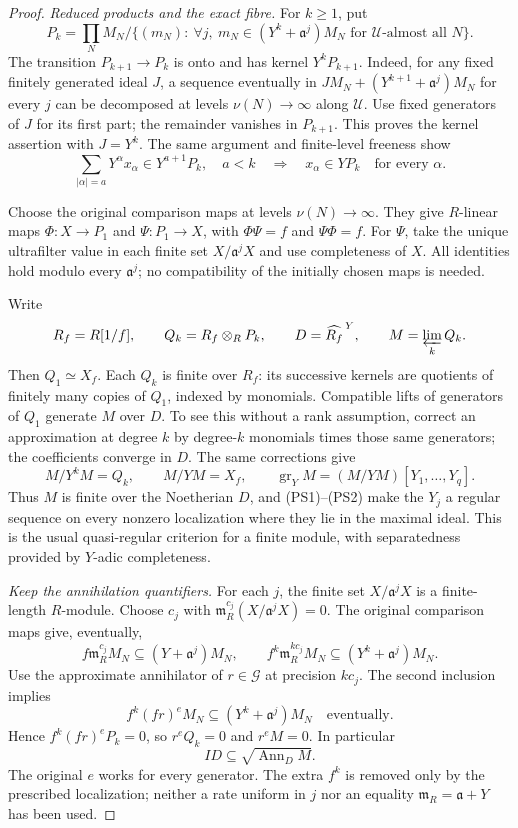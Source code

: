 \begin{proof}
\emph{Reduced products and the exact fibre.}
For \(k\geq1\), put
\[
 P_k=\prod_NM_N\Big/
 \{(m_N):\ \forall j,\
 m_N\in(Y^k+\mathfrak a^j)M_N
 \text{ for }\mathcal U\text{-almost all }N\}.
\]
The transition \(P_{k+1}\to P_k\) is onto and has kernel
\(Y^kP_{k+1}\).  Indeed, for any fixed finitely generated ideal
\(J\), a sequence eventually in
\(JM_N+(Y^{k+1}+\mathfrak a^j)M_N\) for every \(j\) can be
decomposed at levels \(\nu(N)\to\infty\) along \(\mathcal U\).
Use fixed generators of \(J\) for its first part; the remainder
vanishes in \(P_{k+1}\).  This proves the kernel assertion with
\(J=Y^k\).  The same argument and finite-level freeness show
\[
 \sum_{|\alpha|=a}Y^\alpha x_\alpha\in Y^{a+1}P_k,\quad a<k
 \quad\Longrightarrow\quad x_\alpha\in YP_k
 \quad\text{for every }\alpha.                              \tag{PS1}
\]

Choose the original comparison maps at levels
\(\nu(N)\to\infty\).  They give \(R\)-linear maps
\(\Phi:X\to P_1\) and \(\Psi:P_1\to X\), with
\(\Phi\Psi=f\) and \(\Psi\Phi=f\).
For \(\Psi\), take the unique ultrafilter value in each finite
set \(X/\mathfrak a^jX\) and use completeness of \(X\).
All identities hold modulo every \(\mathfrak a^j\);
no compatibility of the initially chosen maps is needed.

Write
\[
 R_f=R[1/f],\qquad Q_k=R_f\otimes_RP_k,\qquad
 D=\widehat{R_f}^{\,Y},\qquad M=\varprojlim_kQ_k.
\]
Then \(Q_1\simeq X_f\).  Each \(Q_k\) is finite over \(R_f\):
its successive kernels are quotients of finitely many copies of
\(Q_1\), indexed by monomials.  Compatible lifts of generators
of \(Q_1\) generate \(M\) over \(D\).  To see this without a
rank assumption, correct an approximation at degree \(k\) by
degree-\(k\) monomials times those same generators; the coefficients
converge in \(D\).  The same corrections give
\[
 M/Y^kM=Q_k,\qquad M/YM=X_f,\qquad
 \operatorname{gr}_YM=(M/YM)[Y_1,\ldots,Y_q].                 \tag{PS2}
\]
Thus \(M\) is finite over the Noetherian \(D\), and (PS1)--(PS2)
make the \(Y_j\) a regular sequence on every nonzero localization
where they lie in the maximal ideal.  This is the usual
quasi-regular criterion for a finite module, with separatedness
provided by \(Y\)-adic completeness.

\emph{Keep the annihilation quantifiers.}
For each \(j\), the finite set \(X/\mathfrak a^jX\) is a
finite-length \(R\)-module.  Choose \(c_j\) with
\(\mathfrak m_R^{c_j}(X/\mathfrak a^jX)=0\).
The original comparison maps give, eventually,
\[
 f\mathfrak m_R^{c_j}M_N\subseteq(Y+\mathfrak a^j)M_N,
 \qquad
 f^k\mathfrak m_R^{kc_j}M_N\subseteq(Y^k+\mathfrak a^j)M_N.
                                                               \tag{PS3}
\]
Use the approximate annihilator of \(r\in\mathcal G\) at
precision \(kc_j\).  The second inclusion implies
\[
 f^k(fr)^eM_N\subseteq(Y^k+\mathfrak a^j)M_N
 \quad\text{eventually}.
\]
Hence \(f^k(fr)^eP_k=0\), so \(r^eQ_k=0\) and \(r^eM=0\).
In particular
\[
                   ID\subseteq\sqrt{\operatorname{Ann}_DM}. \tag{PS4}
\]
The original \(e\) works for every generator.  The extra \(f^k\)
is removed only by the prescribed localization; neither a rate
uniform in \(j\) nor an equality
\(\mathfrak m_R=\mathfrak a+Y\) has been used.


\end{proof}
